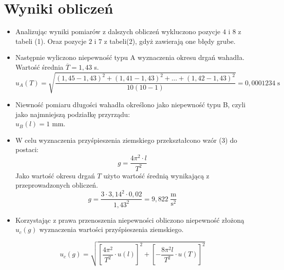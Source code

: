 \documentclass{article}
\begin{document}

\section{Wyniki obliczeń}
	\begin{itemize}
		\item Analizując wyniki pomiarów z dalszych obliczeń wykluczono pozycje $4$ i $8$ z tabeli (1). Oraz pozycje $2$ i $7$ z tabeli(2), gdyż zawierają one błędy grube. %
		
		\item Następnie wyliczono niepewność typu A wyznaczenia okresu drgań wahadła.\\
			Wartość średnia $\overline{T} = 1,43$ s. %
			\begin{equation*}
				u_A(T) = \sqrt{ \frac{(1,45 - 1,43)^2 + (1,41 - 1,43)^2 + \dots + (1,42 - 1,43)^2 }{ 10(10-1) } } = 0,0001234 \; \text{s}
			\end{equation*}
	
		\item Niewność pomiaru długości wahadła określono jako niepewność typu B, czyli jako najmniejszą podziałkę przyrządu: \\ %
			$u_B(l) = 1$ mm. %
			
		\item W celu wyznaczenia przyśpieszenia ziemskiego przekształcono wzór (3) do postaci:
			\begin{equation}
				g = \frac{4\pi^2\cdot l}{T^2}
			\end{equation}
			Jako wartość okresu drgań $T$ użyto wartość średnią wynikającą z przeprowadzonych obliczeń. 
			\begin{equation*}
				g = \frac{3\cdot 3,14^2 \cdot 0,02}{1,43^2} = 9,822 \; \frac{\text{m}}{\text{s}^2}
			\end{equation*}
		
		\item Korzystając z prawa przenoszenia niepewności obliczono niepewność złożoną $u_c(g)$ wyznaczenia wartości przyśpieszenia ziemskiego.
			
			\begin{equation*}
				u_c(g) = \sqrt{ \left[ \frac{4\pi^2}{T^2}\cdot u(l) \right]^2 + \left[ -\frac{8\pi^2 l}{T^2} \cdot u(T) \right]^2 }	
			\end{equation*}


	\end{itemize}
\end{document}
